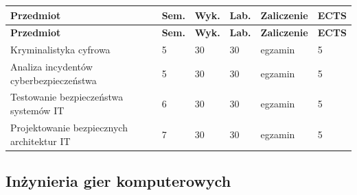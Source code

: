 \documentclass[12pt,a4paper]{article}
\newcommand{\thdrule}{\noalign{\global\setlength{\extrarowheight}{0pt}}}
\newcommand{\thdend}{\noalign{\global\setlength{\extrarowheight}{4pt}}}
\begin{document}
{\scriptsize
\begin{longtable}{m{6.5cm}m{0.7cm}m{1cm}m{1cm}m{1.7cm}m{0.7cm}}
\thdrule\toprule
\rowcolor{pjatkRed}
{\color{white}\footnotesize\textbf{\vphantom{Ag}Przedmiot}} & {\color{white}\footnotesize\textbf{\vphantom{Ag}Sem.}} & {\color{white}\footnotesize\textbf{\vphantom{Ag}Wyk.}} & {\color{white}\footnotesize\textbf{\vphantom{Ag}Lab.}} & {\color{white}\footnotesize\textbf{\vphantom{Ag}Zaliczenie}} & {\color{white}\footnotesize\textbf{\vphantom{Ag}ECTS}} \\
\midrule\thdend
\endfirsthead
\thdrule\toprule
\rowcolor{pjatkRed}
{\color{white}\footnotesize\textbf{\vphantom{Ag}Przedmiot}} & {\color{white}\footnotesize\textbf{\vphantom{Ag}Sem.}} & {\color{white}\footnotesize\textbf{\vphantom{Ag}Wyk.}} & {\color{white}\footnotesize\textbf{\vphantom{Ag}Lab.}} & {\color{white}\footnotesize\textbf{\vphantom{Ag}Zaliczenie}} & {\color{white}\footnotesize\textbf{\vphantom{Ag}ECTS}} \\
\midrule\thdend
\endhead
\rowcolor{tableRowLight} Kryminalistyka cyfrowa & 5 & 30 & 30 & {\scriptsize egzamin} & 5 \\
\rowcolor{tableRowAlt} Analiza incydentów cyberbezpieczeństwa & 5 & 30 & 30 & {\scriptsize egzamin} & 5 \\
\rowcolor{tableRowLight} Testowanie bezpieczeństwa systemów IT & 6 & 30 & 30 & {\scriptsize egzamin} & 5 \\
\rowcolor{tableRowAlt} Projektowanie bezpiecznych architektur IT & 7 & 30 & 30 & {\scriptsize egzamin} & 5 \\
\bottomrule
\end{longtable}}

\subsection*{Inżynieria gier komputerowych}
\end{document}
